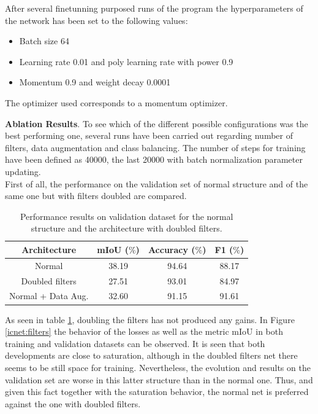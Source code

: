 After several finetunning purposed runs of the program the hyperparameters of the network has been set to the following values:

\begin{itemize}
\item Batch size 64
\item Learning rate 0.01 and poly learning rate with power 0.9
\item Momentum 0.9 and weight decay 0.0001
\end{itemize}

The optimizer used corresponds to a momentum optimizer.\newline

\textbf{Ablation Results}. To see which of the different possible configurations was the best performing one, several runs have been carried out regarding number of filters, data augmentation and class balancing. The number of steps for training have been defined as 40000, the last 20000 with batch normalization parameter updating.\\

First of all, the performance on the validation set  of normal structure and  of the same one but with filters doubled are compared.

\begin{table}[h!]
  \begin{center}
    
    \begin{tabular}{|c|c|c|c|} %
      \textbf{Architecture} & \textbf{mIoU ($\%$)} & \textbf{Accuracy ($\%$)} & \textbf{F1 ($\%$)} \\
      \hline
      Normal & 38.19 & 94.64 & 88.17\\
      \hline
      Doubled filters & 27.51 & 93.01 & 84.97\\  
      \hline
      Normal + Data Aug. & 32.60 & 91.15 & 91.61\\
    \end{tabular}
    \caption{Performance results on validation dataset for the normal structure and the architecture with doubled filters.}
    \label{icnet:table1}
  \end{center}
\end{table}

As seen in table \ref{icnet:table1}, doubling the filters has not produced any gains. In Figure \ref{icnet:filters} the behavior of the losses as well as the metric mIoU in both training and validation datasets can be observed.  It is seen that both developments are close to saturation, although in the doubled filters net there seems to be still space for training. Nevertheless, the evolution and results on the validation set are worse in this latter structure than in the normal one. Thus, and given this fact together with the saturation behavior, the normal net is preferred against the one with doubled filters.\newline

